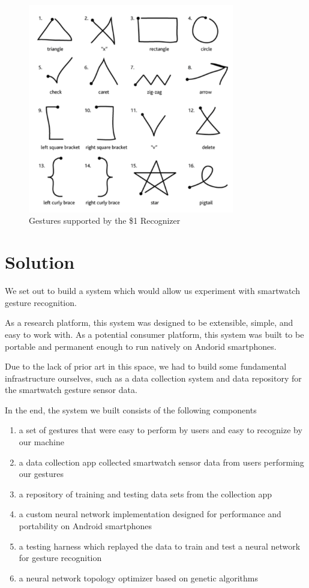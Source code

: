 \documentclass{report}
\begin{document}

\begin{figure}[ht!]
  \label{gestures}
  \centering
  \includegraphics[width=90mm]{gestures}
  \caption{Gestures supported by the \$1 Recognizer}
\end{figure}

\chapter{Solution}


We set out to build a system which would allow us experiment with smartwatch gesture recognition.

As a research platform, this system was designed to be extensible, simple, and easy to work with. As a potential consumer platform, this system was built to be portable and permanent enough to run natively on Andorid smartphones.

Due to the lack of prior art in this space, we had to build some fundamental infrastructure ourselves, such as a data collection system and data repository for the smartwatch gesture sensor data.

In the end, the system we built consists of the following components
\begin{enumerate}
\item a set of gestures that were easy to perform by users and easy to recognize by our machine
\item a data collection app collected smartwatch sensor data from users performing our gestures
\item a repository of training and testing data sets from the collection app
\item a custom neural network implementation designed for performance and portability on Android smartphones
\item a testing harness which replayed the data to train and test a neural network for gesture recognition
\item a neural network topology optimizer based on genetic algorithms
\end{enumerate}
\end{document}
